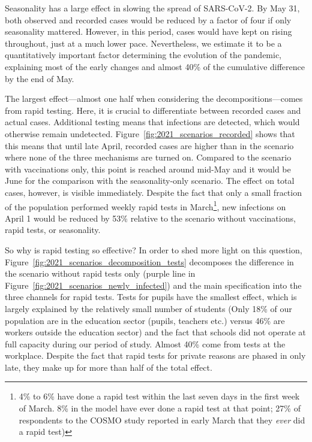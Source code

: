 Seasonality has a large effect in slowing the spread of SARS-CoV-2. By May 31, both
observed and recorded cases would be reduced by a factor of four if only seasonality
mattered. However, in this period, cases would have kept on rising throughout, just at a
much lower pace. Nevertheless, we estimate it to be a quantitatively important factor
determining the evolution of the pandemic, explaining most of the early changes and
almost 40\% of the cumulative difference by the end of May.

The largest effect---almost one half when considering the decompositions---comes from
rapid testing. Here, it is crucial to differentiate between recorded cases and actual
cases. Additional testing means that infections are detected, which would otherwise
remain undetected. Figure~\ref{fig:2021_scenarios_recorded} shows that this means that
until late April, recorded cases are higher than in the scenario where none of the three
mechanisms are turned on. Compared to the scenario with vaccinations only, this point is
reached around mid-May and it would be June for the comparison with the seasonality-only
scenario. The effect on total cases, however, is visible immediately. Despite the fact
that only a small fraction of the population performed weekly rapid tests in
March\footnote{4\% to 6\% have done a rapid test within the last seven days in the first
week of March. 8\% in the model have ever done a rapid test at that point; 27\% of
respondents to the COSMO study reported in early March that they \textit{ever} did a
rapid test)}, new infections on April 1 would be reduced by 53\% relative to the scenario
without vaccinations, rapid tests, or seasonality.

So why is rapid testing so effective? In order to shed more light on this question,
Figure~\ref{fig:2021_scenarios_decomposition_tests} decomposes the difference in the
scenario without rapid tests only (purple line in
Figure~\ref{fig:2021_scenarios_newly_infected}) and the main specification into the three
channels for rapid tests. Tests for pupils have the smallest effect, which is largely
explained by the relatively small number of students (Only 18\% of our population are in
the education sector (pupils, teachers etc.) versus  46\% are workers outside the
education sector) and the fact that schools did not operate at full capacity during our
period of study. Almost 40\% come from tests at the workplace. Despite the fact that
rapid tests for private reasons are phased in only late, they make up for more than half
of the total effect.

